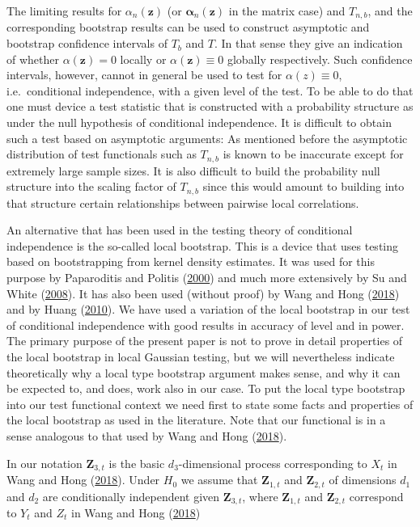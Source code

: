 \documentclass[
  12pt,
  letterpaper]{article}
\numberwithin{equation}{section}
\newcommand{\Z}{\bm{Z}}
\newcommand{\z}{\bm{z}}
\newcommand{\falpha}{\bm{\alpha}}
\begin{document}
The limiting results for \(\alpha_n(\z)\) (or \({\falpha_n}(\z)\) in the matrix case) and \(T_{n,b}\), and the corresponding bootstrap results can be used to construct asymptotic and bootstrap confidence intervals of \(T_b\) and \(T\). In that sense they give an indication of whether \(\alpha(\z) = 0\) locally or \(\alpha(\z) \equiv 0\) globally respectively. Such confidence intervals, however, cannot in general be used to test for \(\alpha(z) \equiv 0\), i.e.~conditional independence, with a given level of the test. To be able to do that one must device a test statistic that is constructed with a probability structure as under the null hypothesis of conditional independence. It is difficult to obtain such a test based on asymptotic arguments: As mentioned before the asymptotic distribution of test functionals such as \(T_{n,b}\) is known to be inaccurate except for extremely large sample sizes. It is also difficult to build the probability null structure into the scaling factor of \(T_{n,b}\) since this would amount to building into that structure certain relationships between pairwise local correlations.

An alternative that has been used in the testing theory of conditional independence is the so-called local bootstrap. This is a device that uses testing based on bootstrapping from kernel density estimates. It was used for this purpose by Paparoditis and Politis (\protect\hyperlink{ref-paparoditis2000local}{2000}) and much more extensively by Su and White (\protect\hyperlink{ref-su2008nonparametric}{2008}). It has also been used (without proof) by Wang and Hong (\protect\hyperlink{ref-wang2017characteristic}{2018}) and by Huang (\protect\hyperlink{ref-huang2010testing}{2010}). We have used a variation of the local bootstrap in our test of conditional independence with good results in accuracy of level and in power. The primary purpose of the present paper is not to prove in detail properties of the local bootstrap in local Gaussian testing, but we will nevertheless indicate theoretically why a local type bootstrap argument makes sense, and why it can be expected to, and does, work also in our case. To put the local type bootstrap into our test functional context we need first to state some facts and properties of the local bootstrap as used in the literature. Note that our functional is in a sense analogous to that used by Wang and Hong (\protect\hyperlink{ref-wang2017characteristic}{2018}).

In our notation \(\Z_{3,t}\) is the basic \(d_3\)-dimensional process corresponding to \(X_t\) in Wang and Hong (\protect\hyperlink{ref-wang2017characteristic}{2018}). Under \(H_0\) we assume that \(\Z_{1,t}\) and \(\Z_{2,t}\) of dimensions \(d_1\) and \(d_2\) are conditionally independent given \(\Z_{3,t}\), where \(\Z_{1,t}\) and \(\Z_{2,t}\) correspond to \(Y_t\) and \(Z_t\) in Wang and Hong (\protect\hyperlink{ref-wang2017characteristic}{2018})
\end{document}
